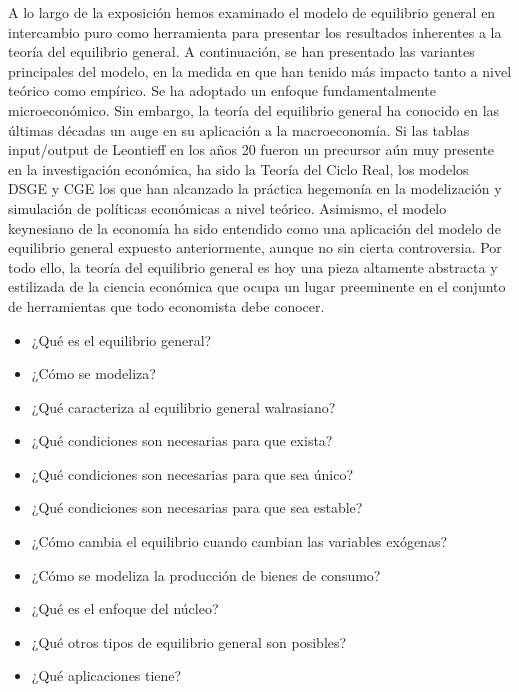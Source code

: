 \documentclass{nuevotema}
\begin{document}
A lo largo de la exposición hemos examinado el modelo de equilibrio general en intercambio puro como herramienta para presentar los resultados inherentes a la teoría del equilibrio general. A continuación, se han presentado las variantes principales del modelo, en la medida en que han tenido más impacto tanto a nivel teórico como empírico. Se ha adoptado un enfoque fundamentalmente microeconómico. Sin embargo, la teoría del equilibrio general ha conocido en las últimas décadas un auge en su aplicación a la macroeconomía. Si las tablas input/output de Leontieff en los años 20 fueron un precursor aún muy presente en la investigación económica, ha sido la Teoría del Ciclo Real, los modelos DSGE y CGE los que han alcanzado la práctica hegemonía en la modelización y simulación de políticas económicas a nivel teórico. Asimismo, el modelo keynesiano de la economía ha sido entendido como una aplicación del modelo de equilibrio general expuesto anteriormente, aunque no sin cierta controversia. Por todo ello, la teoría del equilibrio general es hoy una pieza altamente abstracta y estilizada de la ciencia económica que ocupa un lugar preeminente en el conjunto de herramientas que todo economista debe conocer.

\begin{itemize}
	\item ¿Qué es el equilibrio general?
	\item ¿Cómo se modeliza?
	\item ¿Qué caracteriza al equilibrio general walrasiano?
	\item ¿Qué condiciones son necesarias para que exista?
	\item ¿Qué condiciones son necesarias para que sea único?
	\item ¿Qué condiciones son necesarias para que sea estable?
	\item ¿Cómo cambia el equilibrio cuando cambian las variables exógenas?
	\item ¿Cómo se modeliza la producción de bienes de consumo?
	\item ¿Qué es el enfoque del núcleo?
	\item ¿Qué otros tipos de equilibrio general son posibles?
	\item ¿Qué aplicaciones tiene?
\end{itemize}

\esquemacorto
\end{document}
